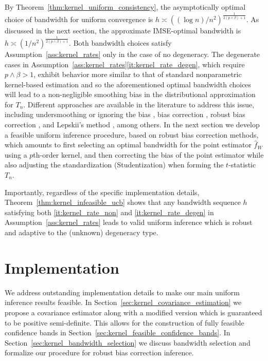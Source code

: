 \documentclass[11pt,lof]{puthesis}
\theoremstyle{break}
\theoremstyle{proof}
\begin{document}
By Theorem~\ref{thm:kernel_uniform_consistency}, the asymptotically optimal
choice of
bandwidth for uniform convergence is
$h \asymp ((\log n)/n^2)^{\frac{1}{2(p \wedge \beta)+1}}$.
As discussed in the next section, the approximate
IMSE-optimal bandwidth is $h \asymp (1/n^2)^{\frac{1}{2(p \wedge \beta)+1}}$.
Both bandwidth choices satisfy Assumption~\ref{ass:kernel_rates} only in the
case of
no degeneracy. The degenerate cases in
Assumption~\ref{ass:kernel_rates}\ref{it:kernel_rate_degen}, which require
$p \wedge \beta > 1$, exhibit behavior more similar to that of standard
nonparametric kernel-based estimation and so the aforementioned optimal
bandwidth choices will lead to a non-negligible smoothing bias in the
distributional approximation for $T_n$. Different approaches are available in
the literature to address this issue, including undersmoothing or ignoring the
bias \citep{hall2001bootstrapping}, bias correction \citep{hall1992effect},
robust bias correction \citep{calonico2018effect, calonico2022coverage}, and
Lepskii's method
\citep{lepskii1992asymptotically,birge2001alternative}, among others. In the
next section we develop a feasible uniform inference procedure, based on robust
bias correction methods, which amounts to first selecting an optimal bandwidth
for the point estimator $\hat{f}_W$ using a $p$th-order kernel, and then
correcting the bias of the point estimator while also adjusting the
standardization (Studentization) when forming the $t$-statistic $T_n$.

Importantly, regardless of the specific implementation details,
Theorem~\ref{thm:kernel_infeasible_ucb} shows that any bandwidth sequence $h$
satisfying both \ref{it:kernel_rate_non} and \ref{it:kernel_rate_degen}
in Assumption~\ref{ass:kernel_rates} leads to valid uniform inference which is
robust and adaptive to the (unknown) degeneracy type.

\section{Implementation}
\label{sec:kernel_implementation}

We address outstanding implementation details to make our main uniform
inference results feasible. In Section~\ref{sec:kernel_covariance_estimation} we
propose a covariance estimator along with a modified version which is
guaranteed to be positive semi-definite. This allows for the construction of
fully feasible confidence bands in
Section~\ref{sec:kernel_feasible_confidence_bands}.
In Section~\ref{sec:kernel_bandwidth_selection} we discuss bandwidth selection
and formalize our procedure for robust bias correction inference.
\end{document}
